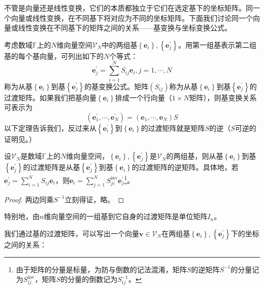 \documentclass[main.tex]{subfiles}
\begin{document}
不管是向量还是线性变换，它们的本质都独立于它们在选定基下的坐标矩阵。同一个向量或线性变换，在不同基下将对应为不同的坐标矩阵。下面我们讨论同一个向量或线性变换在不同基下的矩阵之间的关系——基变换与坐标变换公式。

考虑数域$\mathbb{F}$上的$N$维向量空间$\mathcal{V}_N$中的两组基$\left\{\mathbf{e}_i\right\},\left\{\mathbf{e}^\prime_j\right\}$。用第一组基表示第二组基的每个基向量，可列出如下的$N$个等式：
\[\mathbf{e}^\prime_j=\sum_{i=1}^NS_{ij}\mathbf{e}_i,j=1,\cdots,N\]
称为从基$\left\{\mathbf{e}_i\right\}$到基$\left\{\mathbf{e}^\prime_j\right\}$的基变换公式。矩阵$\left(S_{ij}\right)$称为从基$\left\{\mathbf{e}_i\right\}$到基$\left\{\mathbf{e}^\prime_j\right\}$的过渡矩阵。如果我们把基向量$\left\{\mathbf{e}_i\right\}$排成一个行向量（$1\times N$矩阵），则基变换关系可表示为
\[
\left(\mathbf{e}_1^\prime,\cdots,\mathbf{e}_N^\prime\right)=\left(\mathbf{e}_1,\cdots,\mathbf{e}_N\right)S
\]
以下定理告诉我们，反过来从$\left\{\mathbf{e}_i^\prime\right\}$到$\left\{\mathbf{e}_i\right\}$的过渡矩阵就是矩阵$S$的逆（$S$可逆的证明见\cite[p.~52,例题4.4]{周胜林2012线性代数}。）

\begin{theorem}\label{thm:II.5.1}
设$\mathcal{V}_N$是数域$\mathbb{F}$上的$N$维向量空间，$\left\{\mathbf{e}_i\right\},\left\{\mathbf{e}^\prime_j\right\}$是$\mathcal{V}_N$的两组基，则从基$\left\{\mathbf{e}_i\right\}$到基$\left\{\mathbf{e}^\prime_j\right\}$的过渡矩阵是从基$\left\{\mathbf{e}^\prime_j\right\}$到基$\left\{\mathbf{e}_i\right\}$的过渡矩阵的逆矩阵。具体地，若$\mathbf{e}^\prime_j=\sum_{i=1}^NS_{ij}\mathbf{e}_i$，则$\mathbf{e}_i=\sum_{j=1}^NS^\mathrm{inv}_{ji}\mathbf{e}^\prime_j$\footnote{由于矩阵的分量是标量，为防与倒数的记法混淆，矩阵$S$的逆矩阵$S^{-1}$的分量记为$S^\mathrm{inv}_{ij}$，矩阵$S$的分量的倒数记为$S^{-1}_{ij}$。}。
\end{theorem}
\begin{proof}
两边同乘$S^{-1}$立刻得证，略。
\end{proof}

特别地，由$n$维向量空间的一组基到它自身的过渡矩阵是单位矩阵$I_n$。

我们通过基的过渡矩阵，可以写出一个向量$\mathbf{v}\in\mathcal{V}_N$在两组基$\left\{\mathbf{e}_i\right\},\left\{\mathbf{e}^\prime_j\right\}$下的坐标之间的关系：
\end{document}
